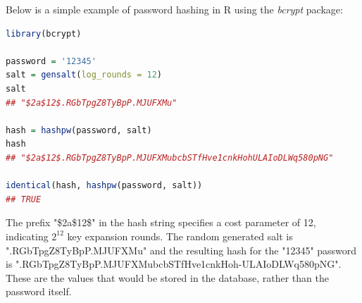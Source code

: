 Below is a simple example of password hashing in R using the \textit{bcrypt} package:


\begin{lstlisting}[language = R]
library(bcrypt)

password = '12345'
salt = gensalt(log_rounds = 12)
salt
## "$2a$12$.RGbTpgZ8TyBpP.MJUFXMu"

hash = hashpw(password, salt)
hash
## "$2a$12$.RGbTpgZ8TyBpP.MJUFXMubcbSTfHve1cnkHohULAIoDLWq580pNG"

identical(hash, hashpw(password, salt))
## TRUE

\end{lstlisting}

The prefix "\$2a\$12\$" in the hash string specifies a cost parameter of 12, indicating $2^{12}$ key expansion rounds. The random generated salt is ".RGbTpgZ8TyBpP.MJUFXMu" and the resulting hash for the "12345" password is ".RGbTpgZ8TyBpP.MJUFXMubcbSTfHve1cnkHoh-ULAIoDLWq580pNG". These are the values that would be stored in the database, rather than the password itself.

